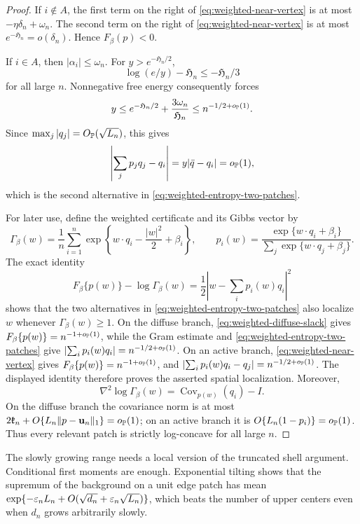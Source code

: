 \begin{proof}
If \(i\notin A\), the first term on the right of
\eqref{eq:weighted-near-vertex} is at most
\(-\eta\delta_n+\omega_n\). The second term on the right of
\eqref{eq:weighted-near-vertex} is at most
\(e^{-\mathfrak H_n}=o(\delta_n)\).
Hence \(F_\beta(p)<0\).

If \(i\in A\), then \(|\alpha_i|\le\omega_n\).  For
\(y>e^{-\mathfrak H_n/2}\),
\[
 \log(e/y)-\mathfrak H_n\le-\mathfrak H_n/3
\]
for all large \(n\).  Nonnegative free energy consequently forces
\[
 y\le e^{-\mathfrak H_n/2}+\frac{3\omega_n}{\mathfrak H_n}
 \le n^{-1/2+o_{\mathbb P}(1)}.
\]
Since \(\max_j|q_j|=O_{\mathbb P}(\sqrt{L_n})\), this gives
\[
 \left|\sum_jp_jq_j-q_i\right|
 =y|\bar q-q_i|=o_{\mathbb P}(1),
\]
which is the second alternative in
\eqref{eq:weighted-entropy-two-patches}.

For later use, define the weighted certificate and its Gibbs vector by
\[
 \Gamma_\beta(w)
 =\frac1n\sum_{i=1}^n
   \exp\left\{w\cdot q_i-\frac{|w|^2}{2}+\beta_i\right\},
 \qquad
 p_i(w)
 =\frac{\exp\{w\cdot q_i+\beta_i\}}
        {\sum_j\exp\{w\cdot q_j+\beta_j\}}.
\]
The exact identity
\[
 F_\beta\{p(w)\}-\log\Gamma_\beta(w)
 =
 \frac12\left|w-\sum_i p_i(w)q_i\right|^2
\]
shows that the two alternatives in
\eqref{eq:weighted-entropy-two-patches} also localize \(w\) whenever
\(\Gamma_\beta(w)\ge1\). On the diffuse branch,
\eqref{eq:weighted-diffuse-slack} gives
\(F_\beta\{p(w)\}=n^{-1+o_{\mathbb P}(1)}\), while the Gram estimate and
\eqref{eq:weighted-entropy-two-patches} give
\(\lvert\sum_i p_i(w)q_i\rvert=n^{-1/2+o_{\mathbb P}(1)}\). On an active
branch, \eqref{eq:weighted-near-vertex} gives
\(F_\beta\{p(w)\}=n^{-1+o_{\mathbb P}(1)}\), and
\(\lvert\sum_i p_i(w)q_i-q_j\rvert=n^{-1/2+o_{\mathbb P}(1)}\). The displayed
identity therefore proves the asserted spatial localization.
Moreover,
\[
 \nabla^2\log\Gamma_\beta(w)
 =\operatorname{Cov}_{p(w)}(q_i)-I.
\]
On the diffuse branch the covariance norm is at most
\(2\mathfrak k_n+O\{L_n\|p-\mathbf u_n\|_1\}=o_{\mathbb P}(1)\); on an active branch it is
\(O\{L_n(1-p_i)\}=o_{\mathbb P}(1)\).  Thus every relevant patch is strictly
log-concave for all large \(n\).
\end{proof}

The slowly growing range needs a local version of the truncated shell
argument.  Conditional first moments are enough.  Exponential tilting
shows that the supremum of the background on a unit edge patch has mean
\(\exp\{-\varepsilon_nL_n+O(\sqrt{d_n}+\varepsilon_n\sqrt{L_n})\}\), which beats the
number of upper centers even when \(d_n\) grows arbitrarily slowly.

